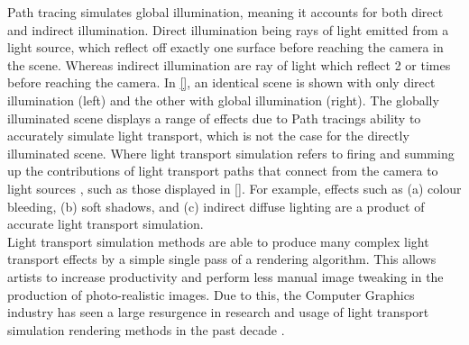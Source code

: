 \documentclass[ %
                    author={Callum Pearce},
                supervisor={Dr. Neill Campbell},
                    degree={MEng},
                     title={How effective are Temporal difference learning methods for reducing the number of zero contribution light paths while still accurately approximating Global Illumination in Path tracing?},
                  subtitle={},
                      type={research},
                      year={2019} ]{dissertation}
\begin{document}

Path tracing simulates global illumination, meaning it accounts for both direct and 
indirect illumination. Direct illumination being rays of light emitted from a light 
source, which reflect off exactly one surface before reaching the camera in the 
scene. Whereas indirect illumination are ray of light which reflect 2 or times before
reaching the camera. In \ref{}, an identical scene is shown with only direct illumination
(left) and the other with global illumination (right). The globally illuminated scene displays
a range of effects due to Path tracings ability to accurately simulate light transport, 
which is not the case for the directly illuminated scene. Where light transport simulation
refers to firing and summing up the contributions of light transport paths that connect from the
camera to light sources \cite{keller2016path}, such as those displayed in \ref{}. For 
example, effects such as (a) colour bleeding, (b) soft shadows, and (c) indirect diffuse lighting
are a product of accurate light transport simulation. \\


Light transport simulation methods are able to produce 
many complex light transport effects by a simple single pass of a rendering algorithm.
This allows artists to increase productivity and perform less manual image tweaking
in the production of photo-realistic images. Due to this, the Computer Graphics 
industry has seen a large resurgence in research and usage of light transport simulation 
rendering methods in the past decade \cite{krivanek2014recent}. \\
\end{document}
